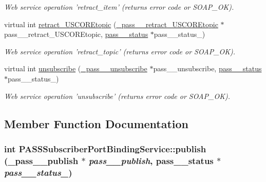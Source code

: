 \begin{DoxyCompactItemize}
\begin{DoxyCompactList}\small\item\em Web service operation 'retract\_\-item' (returns error code or SOAP\_\-OK). \item\end{DoxyCompactList}\item 
\hypertarget{classPASSSubscriberPortBindingService_a046768b434706c49825222ef8cdb0d0a}{
virtual int \hyperlink{classPASSSubscriberPortBindingService_a046768b434706c49825222ef8cdb0d0a}{retract\_\-USCOREtopic} (\hyperlink{class__pass____retract__USCOREtopic}{\_\-pass\_\-\_\-retract\_\-USCOREtopic} $\ast$pass\_\-\_\-retract\_\-USCOREtopic, \hyperlink{classpass____status}{pass\_\-\_\-status} $\ast$pass\_\-\_\-status\_\-)}
\label{classPASSSubscriberPortBindingService_a046768b434706c49825222ef8cdb0d0a}

\begin{DoxyCompactList}\small\item\em Web service operation 'retract\_\-topic' (returns error code or SOAP\_\-OK). \item\end{DoxyCompactList}\item 
\hypertarget{classPASSSubscriberPortBindingService_ae88da323ead7f2eef27a5918b137f011}{
virtual int \hyperlink{classPASSSubscriberPortBindingService_ae88da323ead7f2eef27a5918b137f011}{unsubscribe} (\hyperlink{class__pass____unsubscribe}{\_\-pass\_\-\_\-unsubscribe} $\ast$pass\_\-\_\-unsubscribe, \hyperlink{classpass____status}{pass\_\-\_\-status} $\ast$pass\_\-\_\-status\_\-)}
\label{classPASSSubscriberPortBindingService_ae88da323ead7f2eef27a5918b137f011}

\begin{DoxyCompactList}\small\item\em Web service operation 'unsubscribe' (returns error code or SOAP\_\-OK). \item\end{DoxyCompactList}\end{DoxyCompactItemize}


\subsection{Member Function Documentation}
\hypertarget{classPASSSubscriberPortBindingService_a3eef20e20bd0cbe7500ab6710a1072e1}{
\subsubsection[{publish}]{\setlength{\rightskip}{0pt plus 5cm}int PASSSubscriberPortBindingService::publish ({\bf \_\-pass\_\-\_\-publish} $\ast$ {\em pass\_\-\_\-publish}, \/  {\bf pass\_\-\_\-status} $\ast$ {\em pass\_\-\_\-status\_\-})}}
\label{classPASSSubscriberPortBindingService_a3eef20e20bd0cbe7500ab6710a1072e1}


